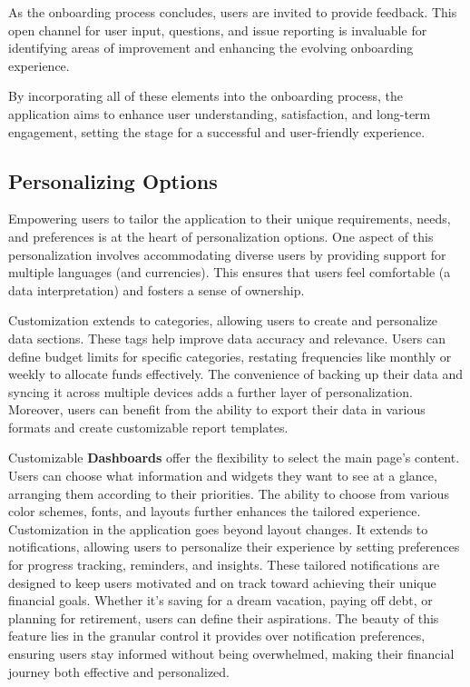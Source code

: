 As the onboarding process concludes, users are invited to provide feedback. This open channel for user input, questions, 
and issue reporting is invaluable for identifying areas of improvement and enhancing the evolving onboarding experience.

By incorporating all of these elements into the onboarding process, the application aims to enhance user understanding, 
satisfaction, and long-term engagement, setting the stage for a successful and user-friendly experience.


\subsection{Personalizing Options}

Empowering users to tailor the application to their unique requirements, needs, and preferences is at the heart of 
personalization options. One aspect of this personalization involves accommodating diverse users by providing support 
for multiple languages (and currencies). This ensures that users feel comfortable (a data interpretation) and fosters 
a sense of ownership.

Customization extends to categories, allowing users to create and personalize data sections. These tags help improve 
data accuracy and relevance. Users can define budget limits for specific categories, restating frequencies like monthly 
or weekly to allocate funds effectively. The convenience of backing up their data and syncing it across multiple 
devices adds a further layer of personalization. Moreover, users can benefit from the ability to export their data in 
various formats and create customizable report templates.

Customizable \textbf{Dashboards} offer the flexibility to select the main page's content. Users can choose what 
information and widgets they want to see at a glance, arranging them according to their priorities. The ability to 
choose from various color schemes, fonts, and layouts further enhances the tailored experience. Customization in the 
application goes beyond layout changes. It extends to notifications, allowing users to personalize their experience 
by setting preferences for progress tracking, reminders, and insights. These tailored notifications are designed to 
keep users motivated and on track toward achieving their unique financial goals. Whether it's saving for a dream 
vacation, paying off debt, or planning for retirement, users can define their aspirations. The beauty of this feature 
lies in the granular control it provides over notification preferences, ensuring users stay informed without being 
overwhelmed, making their financial journey both effective and personalized.



